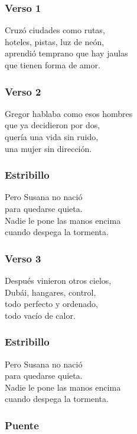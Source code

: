\subsubsection{Verso 1}\label{verso-1}

Cruzó ciudades como rutas,\\
hoteles, pistas, luz de neón,\\
aprendió temprano que hay jaulas\\
que tienen forma de amor.

\subsubsection{Verso 2}\label{verso-2}

Gregor hablaba como esos hombres\\
que ya decidieron por dos,\\
quería una vida sin ruido,\\
una mujer sin dirección.

\subsubsection{Estribillo}\label{estribillo}

Pero Susana no nació\\
para quedarse quieta.\\
Nadie le pone las manos encima\\
cuando despega la tormenta.

\subsubsection{Verso 3}\label{verso-3}

Después vinieron otros cielos,\\
Dubái, hangares, control,\\
todo perfecto y ordenado,\\
todo vacío de calor.

\subsubsection{Estribillo}\label{estribillo-1}

Pero Susana no nació\\
para quedarse quieta.\\
Nadie le pone las manos encima\\
cuando despega la tormenta.

\subsubsection{Puente}\label{puente}

